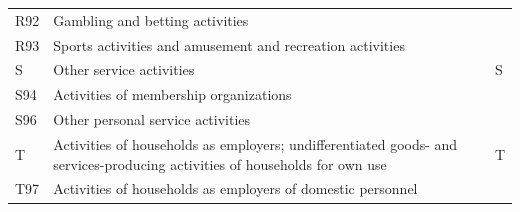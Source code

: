 \documentclass[12pt]{article}
\begin{document}
\begin{tabularx}{\textwidth}{l X l}
R92     & Gambling and betting activities &  \\
R93     & Sports activities and amusement and recreation activities &  \\
S       & Other service activities & S \\
S94     & Activities of membership organizations &  \\
S96     & Other personal service activities &  \\
T       & Activities of households as employers; undifferentiated goods- and services-producing activities of households for own use & T \\
T97     & Activities of households as employers of domestic personnel &  \\
\hline
\end{tabularx}
\end{document}
